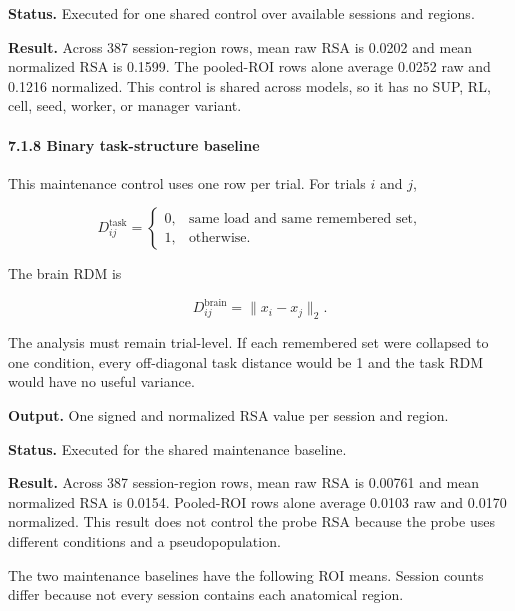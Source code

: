 \documentclass[
  10pt,
]{article}
\begin{document}
\textbf{Status.} Executed for one shared control over available sessions
and regions.

\textbf{Result.} Across 387 session-region rows, mean raw RSA is 0.0202
and mean normalized RSA is 0.1599. The pooled-ROI rows alone average
0.0252 raw and 0.1216 normalized. This control is shared across models,
so it has no SUP, RL, cell, seed, worker, or manager variant.

\hypertarget{binary-task-structure-baseline}{%
\paragraph{7.1.8 Binary task-structure
baseline}\label{binary-task-structure-baseline}}

This maintenance control uses one row per trial. For trials \(i\) and
\(j\),

\[
D_{ij}^{\mathrm{task}}
=
\begin{cases}
0,&\text{same load and same remembered set},\\
1,&\text{otherwise}.
\end{cases}
\]

The brain RDM is

\[
D_{ij}^{\mathrm{brain}}=\lVert x_i-x_j\rVert_2.
\]

The analysis must remain trial-level. If each remembered set were
collapsed to one condition, every off-diagonal task distance would be 1
and the task RDM would have no useful variance.

\textbf{Output.} One signed and normalized RSA value per session and
region.

\textbf{Status.} Executed for the shared maintenance baseline.

\textbf{Result.} Across 387 session-region rows, mean raw RSA is 0.00761
and mean normalized RSA is 0.0154. Pooled-ROI rows alone average 0.0103
raw and 0.0170 normalized. This result does not control the probe RSA
because the probe uses different conditions and a pseudopopulation.

The two maintenance baselines have the following ROI means. Session
counts differ because not every session contains each anatomical region.
\end{document}
